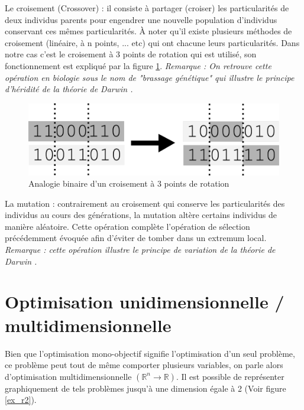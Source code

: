 \documentclass[12pt]{report}
\begin{document}
        Le croisement (Crossover) :
          il consiste à partager (croiser) les particularités de deux individus parents pour engendrer une nouvelle population d'individus conservant ces mêmes particularités. À noter qu'il existe plusieurs méthodes de croisement (linéaire, à n points, ... etc) qui ont chacune leurs particularités. Dans notre cas c'est le croisement à 3 points de rotation qui est utilisé, son fonctionnement est expliqué par la figure \ref{sch_crossover}.
          \emph{Remarque : On retrouve cette opération en biologie sous le nom de "brassage génétique" qui illustre le principe d'héridité de la théorie de Darwin \cite{darwin}.}
          \begin{figure}[h]
            \centering
            \includegraphics{img/crossover.png}
            \caption{Analogie binaire d'un croisement à 3 points de rotation}
            \label{sch_crossover}
          \end{figure}

        La mutation \cite{wiki6} :
          contrairement au croisement qui conserve les particularités des individus au cours des générations, la mutation altère certains individus de manière aléatoire. Cette opération complète l'opération de sélection précédemment évoquée afin d'éviter de tomber dans un extremum local.
          \emph{Remarque : cette opération illustre le principe de variation de la théorie de Darwin \cite{darwin}.}

    \section{Optimisation unidimensionnelle / multidimensionnelle}
      Bien que l'optimisation mono-objectif signifie l'optimisation d'un seul problème, ce problème peut tout de même comporter plusieurs variables, on parle alors d'optimisation multidimensionnelle $(\mathbb{R}^n \rightarrow \mathbb{R})$. Il est possible de représenter graphiquement de tels problèmes jusqu'à une dimension égale à 2 (Voir figure \ref{ex_r2}).
\end{document}
